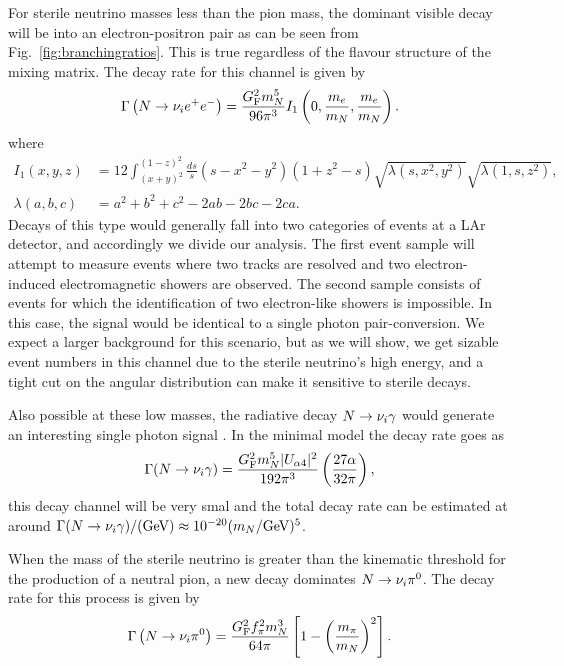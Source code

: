 \documentclass[11pt, a4paper]{article}
\newcommand{\reffig}[1]{Fig.~\ref{#1}}
\def\ster{\ensuremath N}
\begin{document}
For sterile neutrino masses less than the pion mass, the dominant visible decay
will be into an electron-positron pair as can be seen from
\reffig{fig:branchingratios}. This is true regardless of the flavour structure
of the mixing matrix. The decay rate for this channel is given by 
%
\[ \Gamma\left(\ster\to \nu_i e^+e^-\right) =
\frac{G_\text{F}^2m_\ster^5}{96\pi^3}I_1\left(0,\frac{m_e}{m_\ster},\frac{
m_e}{m_\ster}\right).  \]
%
where \begin{align} I_1(x,y,z) & =12 \int_{(x+y)^2}^{(1-z)^2}
\frac{ds}{s}(s-x^2-y^2)(1+z^2-s)\sqrt{\lambda(s,x^2,y^2)}\sqrt{\lambda(1,s,z^2)},\\
\lambda(a,b,c) &= a^2+b^2+c^2 - 2ab-2bc-2ca.  \end{align}
%
Decays of this type would generally fall into two categories of events at a LAr
detector, and accordingly we divide our analysis. The first event sample will
attempt to measure events where two tracks are resolved and two
electron-induced electromagnetic showers are observed.
%
The second sample consists of events for which the identification of two
electron-like showers is impossible. In this case, the signal would be identical
to a single photon pair-conversion. We expect a larger background for this
scenario, but as we will show, we get sizable event numbers in this channel due
to the sterile neutrino's high energy, and a tight cut on the angular
distribution can make it sensitive to sterile decays.

Also possible at these low masses, the radiative decay
$\ster\to\nu_i\gamma$ would generate an interesting single photon
signal \cite{PhysRevD.25.766}. In the minimal model the decay rate goes as
%
\[ \Gamma(\ster\to\nu_i\gamma) = \frac{G_\text{F}^2m_\ster^5 |U_{\alpha 4}|^2}{192 \pi^3} \left( \frac{27 \alpha}{32 \pi} \right), \]
%
this decay channel will be very smal and the total decay rate can be estimated
at around $\Gamma(\ster\to\nu_i\gamma)/(\text{GeV}) \approx 10^{-20}
(m_\ster/\text{GeV})^5$.  

When the mass of the sterile neutrino is greater than the kinematic threshold
for the production of a neutral pion, a new decay dominates $\ster\to\nu_i
\pi^0$. The decay rate for this process is given by
%
\[ \Gamma\left(\ster \to \nu_i \pi^0\right) =
\frac{G_\text{F}^2f_\pi^2m_\ster^3}{64\pi} \left[1-\left( \frac{m_\pi}{m_\ster}
\right)^2\right].  \]
\end{document}
